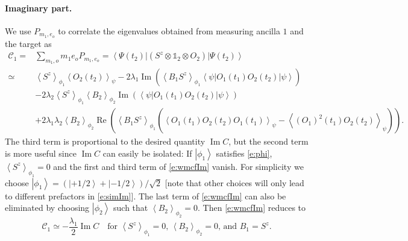 \documentclass[epjST,numbook]{svjour}
\newcommand{\wmcf}{\mathscr{C}}
\newcommand{\ket}[1]{\left \vert #1 \right >}
\newcommand{\matel}[3]{ \displaystyle \left\langle #1 \right \vert #2 \left\vert  #3 \right\rangle }
\newcommand{\expval}[1]{\left\langle #1 \right\rangle}
\newcommand{\impart}[1]{\text{Im}\left[ #1 \right]}
\DeclareMathOperator{\imp }{\mathrm{Im}}
\DeclareMathOperator{\rep}{\mathrm{Re}}
\begin{document}
\paragraph{Imaginary part.}
We use $P_{m_1,e_o}$ to correlate the eigenvalues obtained from measuring ancilla $1$ and the target as
\begin{equation}\label{e:wmcfIm}
	\begin{split}
		\wmcf_1 =& \sum_{m_1,o}m_1 e_o P_{m_1,e_o} = \matel{\Psi(t_2)}{(S^z\otimes\mathds{1}_2\otimes O_2)}{\Psi(t_2)} \\
		\simeq& \expval{S^z}_{\phi_1}\expval{O_2(t_2)}_{\psi} -2\lambda_1\imp\!\left(\expval{B_1S^z}_{\phi_1} \matel{\psi}{O_1(t_1)O_2(t_2)}{\psi}\right)\\
		& -2\lambda_2 \expval{S^z}_{\phi_1} \expval{B_2}_{\phi_2} \imp\left(\matel{\psi}{O_1(t_1)O_2(t_2)}{\psi}\right)\\
		&+2\lambda_1\lambda_2 \expval{B_2}_{\phi_2} \rep\!\left(\expval{B_1S^z}_{\phi_1}\left( \expval{O_1(t_1)O_2(t_2)O_1(t_1)}_\psi - \expval{(O_1)^2(t_1) O_2(t_2)}_\psi \right) \right).
	\end{split}
\end{equation}
The third term is proportional to the desired quantity $\imp C$, but the second term is more useful since $\imp C$ can easily be isolated: If $\ket{\phi_1}$ satisfies \eqref{e:phi}, $\expval{S^z}_{\phi_1}=0$ and the first and third term of \eqref{e:wmcfIm} vanish. For simplicity we choose $\ket{\phi_1}=(\ket{+1/2}+\ket{-1/2})/\sqrt{2}$ [note that other choices will only lead to different prefactors in \eqref{e:simIm}].
The last term of \eqref{e:wmcfIm} can also be eliminated by choosing $\ket{\phi_2}$ such that $\expval{B_2}_{\phi_2} =0$. Then \eqref{e:wmcfIm} reduces to
\begin{equation}\label{e:simIm}
		\wmcf_1 \simeq - \frac{\lambda_1}{2}\imp C \quad\text{for $\expval{S^z}_{\phi_1} =0$, $\expval{B_2}_{\phi_2} =0$, and $B_1=S^z$.}
\end{equation}
\end{document}
